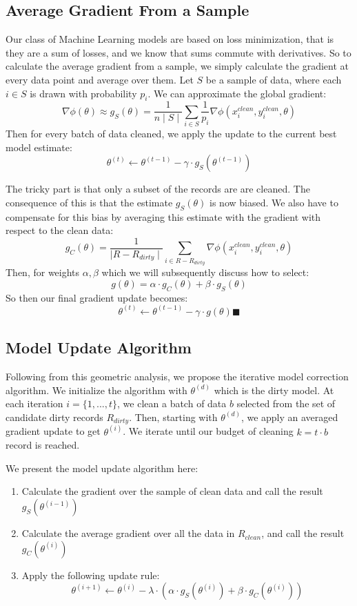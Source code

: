 \subsection{Average Gradient From a Sample}
Our class of Machine Learning models are based on loss minimization, that is they are a sum of losses, and we know that sums commute with derivatives.
So to calculate the average gradient from a sample, we simply calculate the gradient at every data point and average over them.
Let $S$ be a sample of data, where each $i \in S$ is drawn with probability $p_i$.
We can approximate the global gradient:
\[
\nabla\phi(\theta) \approx g_{S}(\theta) = \frac{1}{n\mid S \mid} \sum_{i \in S}\frac{1}{p_i}\nabla\phi(x_i^{clean},y_i^{clean},\theta)
\]
Then for every batch of data cleaned, we apply the update to the current best model estimate:
\[
\theta^{(t)} \leftarrow \theta^{(t-1)} - \gamma \cdot g_{S}(\theta^{(t-1)})
\]

The tricky part is that only a subset of the records are are cleaned.
The consequence of this is that the estimate $g_{S}(\theta)$ is now biased.
We also have to compensate for this bias by averaging this estimate with the gradient with respect to the clean data:
\[
g_C(\theta) = \frac{1}{\mid R - R_{dirty}\mid}\sum_{i \in R - R_{dirty}}\nabla\phi(x_i^{clean},y_i^{clean},\theta)
\]
Then, for weights $\alpha,\beta$ which we will subsequently discuss how to select:
\[
g(\theta) = \alpha \cdot g_C(\theta) + \beta \cdot g_S(\theta)
\]
So then our final gradient update becomes:
\[
\theta^{(t)} \leftarrow \theta^{(t-1)} - \gamma \cdot g(\theta) \blacksquare
\]

\subsection{Model Update Algorithm}
Following from this geometric analysis, we propose the iterative model correction algorithm.
We initialize the algorithm with $\theta^{(d)}$ which is the dirty model.
At each iteration $i=\{1,...,t\}$, we clean a batch of data $b$ selected from the set of candidate dirty records $R_{dirty}$.
Then, starting with $\theta^{(d)}$, we apply an averaged gradient update to get $\theta^{(i)}$.
We iterate until our budget of cleaning $k = t \cdot b$ record is reached.

We present the model update algorithm here:
\begin{enumerate}[noitemsep]
	\item Calculate the gradient over the sample of clean data and call the result $g_S(\theta^{(i-1)})$
	\item Calculate the average gradient over all the data in $R_{clean}$, and call the result $g_C(\theta^{(i)})$
	\item Apply the following update rule:
	\[
	\theta^{(i+1)} \leftarrow \theta^{(i)} - \lambda \cdot(\alpha\cdot g_S(\theta^{(i)}) + \beta \cdot  g_C(\theta^{(i)}))
	\]
\end{enumerate} 

